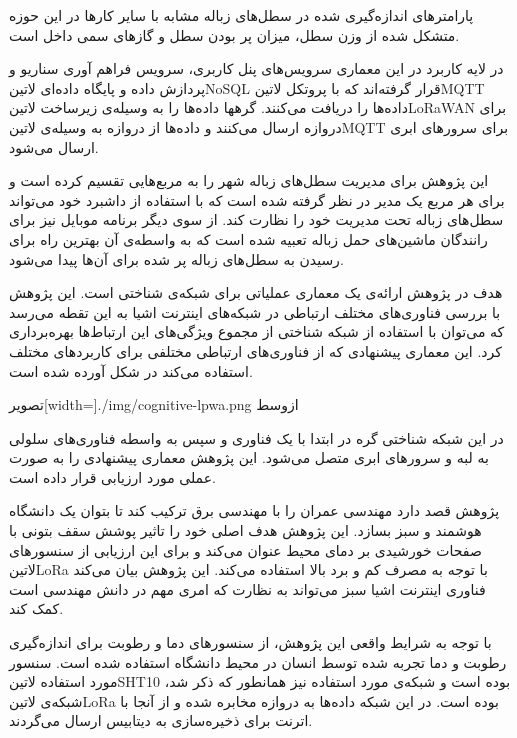 پارامترهای اندازه‌گیری شده در سطل‌های زباله مشابه با سایر کارها در این حوزه متشکل شده از وزن سطل، میزان پر بودن سطل و گازهای سمی داخل است.

در لایه کاربرد در این معماری سرویس‌های پنل کاربری، سرویس فراهم آوری سناریو و پردازش داده و پایگاه داده‌ای ‌لاتین{NoSQL} قرار گرفته‌اند که با پروتکل ‌لاتین{MQTT} داده‌ها را دریافت می‌کنند.
گرهها داده‌ها را به وسیله‌ی زیرساخت ‌لاتین{LoRaWAN} برای دروازه ارسال می‌کنند و داده‌ها از دروازه به وسیله‌ی ‌لاتین{MQTT} برای سرورهای ابری ارسال می‌شود.

این پژوهش برای مدیریت سطل‌های زباله شهر را به مربع‌هایی تقسیم کرده است و برای هر مربع یک مدیر در نظر گرفته شده است که با استفاده از داشبرد خود می‌تواند سطل‌های زباله تحت مدیریت خود را نظارت کند.
از سوی دیگر برنامه موبایل نیز برای رانندگان ماشین‌های حمل زباله تعبیه شده است که به واسطه‌ی آن بهترین راه برای رسیدن به سطل‌های زباله پر شده برای آن‌ها پیدا می‌شود.


هدف در پژوهش  ارائه‌ی یک معماری عملیاتی برای شبکه‌ی شناختی است. این پژوهش با بررسی فناوری‌های مختلف ارتباطی در شبکه‌های اینترنت اشیا به این تقطه می‌رسد که می‌توان
با استفاده از شبکه شناختی از مجموع ویژگی‌های این ارتباط‌ها بهره‌برداری کرد. این معماری پیشنهادی که از فناوری‌های ارتباطی مختلفی برای کاربردهای مختلف استفاده می‌کند در شکل 
آورده شده است.

‌تصویر[width=\textwidth]{./img/cognitive-lpwa.png}
‌ازوسط

در این شبکه شناختی گره در ابتدا با یک فناوری و سپس به واسطه فناوری‌های سلولی به لبه و سرورهای ابری متصل می‌شود. این پژوهش معماری پیشنهادی را به صورت عملی مورد ارزیابی قرار داده است.


پژوهش  قصد دارد مهندسی عمران را با مهندسی برق ترکیب کند تا بتوان یک دانشگاه هوشمند و سبز بسازد. این پژوهش هدف اصلی خود را تاثیر پوشش سقف بتونی با صفحات خورشیدی
بر دمای محیط عنوان می‌کند و برای این ارزیابی از سنسورهای ‌لاتین{LoRa} با توجه به مصرف کم و برد بالا استفاده می‌کند. این پژوهش بیان می‌کند فناوری اینترنت اشیا سبز می‌تواند به نظارت که امری مهم
در دانش مهندسی است کمک کند.

با توجه به شرایط واقعی این پژوهش، از سنسورهای دما و رطوبت برای اندازه‌گیری رطوبت و دما تجربه شده توسط انسان در محیط دانشگاه استفاده شده است.
سنسور مورد استفاده ‌لاتین{SHT10} بوده است و شبکه‌ی مورد استفاده نیز همانطور که ذکر شد، شبکه‌ی ‌لاتین{LoRa} بوده است. در این شبکه داده‌ها
به دروازه مخابره شده و از آنجا با اترنت برای ذخیره‌سازی به دیتابیس ارسال می‌گردند.

